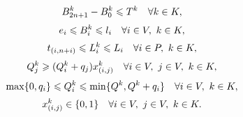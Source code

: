 %
\begin{equation} \label{eq:darp_constraint_9}
  B^k_{2n + 1}
  -
  B^k_{0}
  \leqslant
  T^k
  \quad
  \forall k \in K,
\end{equation}
%
\begin{equation} \label{eq:darp_constraint_10}
  e_i 
  \leqslant
  B^k_{i}
  \leqslant
  l_i
  \quad
  \forall i \in V,
  \ k \in K,
\end{equation}
%
\begin{equation} \label{eq:darp_constraint_11}
  t_{(i,n + i)}
  \leqslant
  L_i^{k}
  \leqslant
  L_i
  \quad
  \forall i \in P,
  \ k \in K,
\end{equation}
%
\begin{equation} \label{eq:darp_constraint_7}
  Q^{k}_j
  \geqslant
  (Q^{k}_i + q_j)
  x_{(i, j)}^{k} 
  \quad
  \forall i \in V, 
  \ j \in V, 
  \ k \in K,
\end{equation}
%
\begin{equation} \label{eq:darp_constraint_12}
  \max \{0, q_{i}\}
  \leqslant
  Q^{k}_i
  \leqslant
  \min \{Q^{k}, Q^{k} + q_{i}\}
  \quad
  \forall i \in V,
  \ k \in K,
\end{equation}
%
\begin{equation} \label{eq:darp_constraint_13}
  x_{(i, j)}^{k} \in \{0, 1\}
  \quad
  \forall i \in V,
  \ j \in V,
  \ k \in K.
\end{equation}


